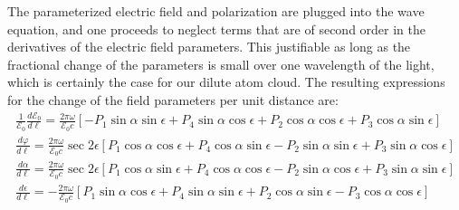 \documentclass[11pt,letter]{article}
\newcommand{\efieldo}{\ensuremath{\mathcal{E}_{0}}}
\begin{document}
The parameterized electric field and polarization are plugged into the wave
equation,  and one proceeds to neglect terms that are of second order in the
derivatives of the electric field parameters.  This justifiable as long as the
fractional change of the parameters is small over one wavelength of the light,
which is certainly the case for our dilute atom cloud.  The resulting
expressions for the change of the field parameters per unit distance are:
\begin{align} 
 \frac{1}{\efieldo} \frac{d \efieldo }{ d \ell} =  
     \frac{2\pi \omega}{\efieldo c} [  
          - P_{1} \sin\alpha\sin\epsilon 
          + P_{4} \sin\alpha\cos\epsilon
          + P_{2} \cos\alpha\cos\epsilon 
          + P_{3} \cos\alpha\sin\epsilon ] \\
 \frac{ d \varphi }{d \ell} = 
     \frac{2\pi\omega}{\efieldo c} \sec 2 \epsilon[ 
            P_{1} \cos\alpha\cos\epsilon 
          + P_{4} \cos\alpha\sin\epsilon
          - P_{2}\sin\alpha\sin\epsilon 
          + P_{3}\sin\alpha\cos\epsilon ] \\
 \frac{ d \alpha}{ d \ell} = 
     \frac{2\pi\omega}{\efieldo c} \sec 2 \epsilon[
            P_{1} \cos\alpha\sin\epsilon 
          + P_{4} \cos\alpha\cos\epsilon
          - P_{2} \sin\alpha\cos\epsilon 
          + P_{3} \sin\alpha\sin\epsilon ] \\
 \frac{ d \epsilon}{ d \ell} = 
     - \frac{2\pi\omega}{\efieldo c }[ 
            P_{1} \sin\alpha\cos\epsilon 
          + P_{4} \sin\alpha\sin\epsilon
          + P_{2} \cos\alpha\sin\epsilon 
          - P_{3} \cos\alpha\cos\epsilon  ] 
 \label{eq:diff-param} 
\end{align}
 
\end{document}
